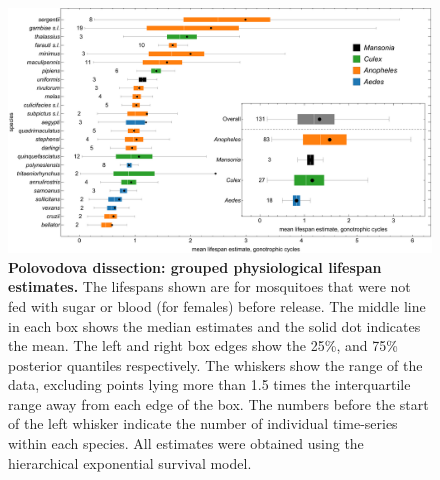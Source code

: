 \documentclass[12pt]{article}
\begin{document}
\begin{figure}[h]
	\centerline{\includegraphics[width=1\textwidth]{./Figure_files/dissection_lifetimes_exponential.pdf}}
	\caption{\textbf{Polovodova dissection: grouped physiological lifespan estimates.} The lifespans shown are for mosquitoes that were not fed with sugar or blood (for females) before release. The middle line in each box shows the median estimates and the solid dot indicates the mean. The left and right box edges show the 25\%, and 75\% posterior quantiles respectively. The whiskers show the range of the data, excluding points lying more than 1.5 times the interquartile range away from each edge of the box. The numbers before the start of the left whisker indicate the number of individual time-series within each species. All estimates were obtained using the hierarchical exponential survival model.}
	\label{fig:dissection_lifetimes_exponential}
\end{figure}
\end{document}
